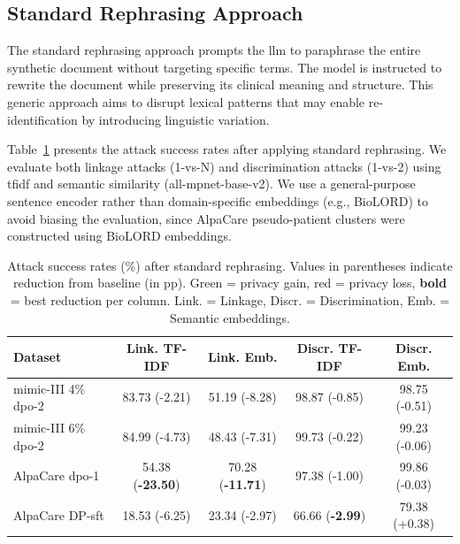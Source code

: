 \subsection{Standard Rephrasing Approach}
\label{subsec:rephrasing}

The standard rephrasing approach prompts the \gls{llm} to paraphrase the entire synthetic document without targeting specific terms. The model is instructed to rewrite the document while preserving its clinical meaning and structure. This generic approach aims to disrupt lexical patterns that may enable re-identification by introducing linguistic variation.

Table~\ref{tab:rephrasing_results} presents the attack success rates after applying standard rephrasing. We evaluate both linkage attacks (1-vs-N) and discrimination attacks (1-vs-2) using \gls{tfidf} and semantic similarity (all-mpnet-base-v2). We use a general-purpose sentence encoder rather than domain-specific embeddings (e.g., BioLORD) to avoid biasing the evaluation, since AlpaCare pseudo-patient clusters were constructed using BioLORD embeddings.

\begin{table}[h]
\centering
\small
\begin{tabular}{lcccc}
\toprule
\textbf{Dataset} & \textbf{Link. TF-IDF} & \textbf{Link. Emb.} & \textbf{Discr. TF-IDF} & \textbf{Discr. Emb.} \\
\midrule
\gls{mimic}-III 4\% \gls{dpo}-2 & 83.73 {\scriptsize(\textcolor{green!50!black}{-2.21})} & 51.19 {\scriptsize(\textcolor{green!50!black}{-8.28})} & 98.87 {\scriptsize(\textcolor{green!50!black}{-0.85})} & 98.75 {\scriptsize(\textcolor{green!50!black}{-0.51})} \\
\gls{mimic}-III 6\% \gls{dpo}-2 & 84.99 {\scriptsize(\textcolor{green!50!black}{-4.73})} & 48.43 {\scriptsize(\textcolor{green!50!black}{-7.31})} & 99.73 {\scriptsize(\textcolor{green!50!black}{-0.22})} & 99.23 {\scriptsize(\textcolor{green!50!black}{-0.06})} \\
AlpaCare \gls{dpo}-1 & 54.38 {\scriptsize(\textbf{\textcolor{green!50!black}{-23.50}})} & 70.28 {\scriptsize(\textbf{\textcolor{green!50!black}{-11.71}})} & 97.38 {\scriptsize(\textcolor{green!50!black}{-1.00})} & 99.86 {\scriptsize(\textcolor{green!50!black}{-0.03})} \\
AlpaCare DP-\gls{sft} & 18.53 {\scriptsize(\textcolor{green!50!black}{-6.25})} & 23.34 {\scriptsize(\textcolor{green!50!black}{-2.97})} & 66.66 {\scriptsize(\textbf{\textcolor{green!50!black}{-2.99}})} & 79.38 {\scriptsize(\textcolor{red!70!black}{+0.38})} \\
\bottomrule
\end{tabular}
\caption{Attack success rates (\%) after standard rephrasing. Values in parentheses indicate reduction from baseline (in pp). \textcolor{green!50!black}{Green} = privacy gain, \textcolor{red!70!black}{red} = privacy loss, \textbf{bold} = best reduction per column. Link. = Linkage, Discr. = Discrimination, Emb. = Semantic embeddings.}
\label{tab:rephrasing_results}
\end{table}

